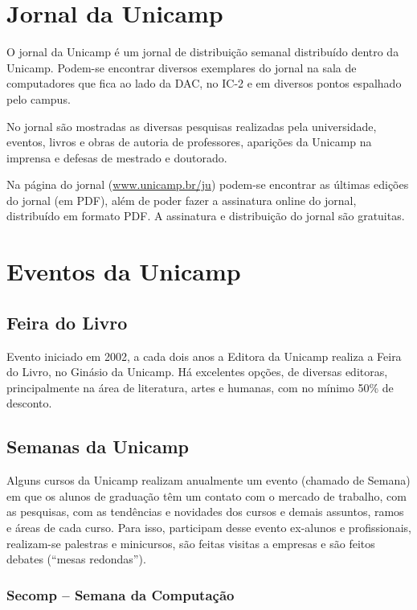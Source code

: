 
\section{Jornal da Unicamp}

O jornal da Unicamp é um jornal de distribuição semanal distribuído dentro da
Unicamp. Podem-se encontrar diversos exemplares do jornal na sala de computadores
que fica ao lado da DAC, no IC-2 e em diversos pontos espalhado pelo campus.

No jornal são mostradas as diversas pesquisas realizadas pela universidade,
eventos, livros e obras de autoria de professores, aparições da Unicamp na
imprensa e defesas de mestrado e doutorado.

Na página do jornal (\url{www.unicamp.br/ju}) podem-se encontrar as
últimas edições do jornal (em PDF), além de poder fazer a assinatura online do
jornal, distribuído em formato PDF. A assinatura e distribuição do jornal são
gratuitas.

\section{Eventos da Unicamp}
\subsection{Feira do Livro}

Evento iniciado em 2002, a cada dois anos a Editora da Unicamp realiza a Feira
do Livro, no Ginásio da Unicamp. Há excelentes opções, de diversas editoras,
principalmente na área de literatura, artes e humanas, com no mínimo 50\% de
desconto.

\subsection{Semanas da Unicamp}

Alguns cursos da Unicamp realizam anualmente um evento (chamado de Semana) em
que os alunos de graduação têm um contato com o mercado de trabalho, com as
pesquisas, com as tendências e novidades dos cursos e demais assuntos, ramos
e áreas de cada curso. Para isso, participam desse evento ex-alunos
e profissionais, realizam-se palestras e minicursos, são feitas visitas
a empresas e são feitos debates (``mesas redondas'').

\subsubsection{Secomp -- Semana da Computação}

